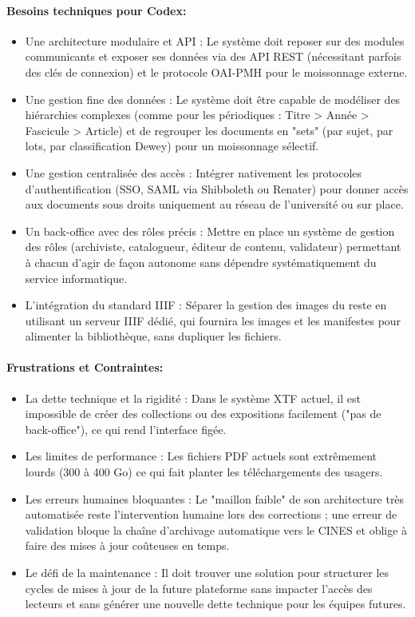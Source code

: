 \paragraph*{Besoins techniques pour Codex:}
\begin{itemize}
	\item Une architecture modulaire et API : Le système doit reposer sur des modules communicants et exposer ses données via des API REST (nécessitant parfois des clés de connexion) et le protocole OAI-PMH pour le moissonnage externe.
\item Une gestion fine des données : Le système doit être capable de modéliser des hiérarchies complexes (comme pour les périodiques : Titre > Année > Fascicule > Article) et de regrouper les documents en "sets" (par sujet, par lots, par classification Dewey) pour un moissonnage sélectif.
\item Une gestion centralisée des accès : Intégrer nativement les protocoles d'authentification (SSO, SAML via Shibboleth ou Renater) pour donner accès aux documents sous droits uniquement au réseau de l'université ou sur place.
\item Un back-office avec des rôles précis : Mettre en place un système de gestion des rôles (archiviste, catalogueur, éditeur de contenu, validateur) permettant à chacun d'agir de façon autonome sans dépendre systématiquement du service informatique.
\item L'intégration du standard IIIF : Séparer la gestion des images du reste en utilisant un serveur IIIF dédié, qui fournira les images et les manifestes pour alimenter la bibliothèque, sans dupliquer les fichiers.
\end{itemize}
\paragraph*{Frustrations et Contraintes:}
\begin{itemize}
	\item La dette technique et la rigidité : Dans le système XTF actuel, il est impossible de créer des collections ou des expositions facilement ("pas de back-office"), ce qui rend l'interface figée.
\item Les limites de performance : Les fichiers PDF actuels sont extrêmement lourds (300 à 400 Go) ce qui fait planter les téléchargements des usagers.
\item Les erreurs humaines bloquantes : Le "maillon faible" de son architecture très automatisée reste l'intervention humaine lors des corrections ; une erreur de validation bloque la chaîne d'archivage automatique vers le CINES et oblige à faire des mises à jour coûteuses en temps.
\item Le défi de la maintenance : Il doit trouver une solution pour structurer les cycles de mises à jour de la future plateforme sans impacter l'accès des lecteurs et sans générer une nouvelle dette technique pour les équipes futures.
\end{itemize}